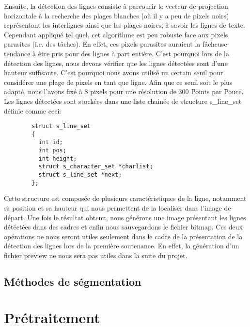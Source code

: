\documentclass[]{report}
\begin{document}
      Ensuite, la détection des lignes consiste à parcourir le vecteur de projection horizontale à la recherche des plages blanches (où il y a peu de pixels noirs) représentant les interlignes ainsi que les plages noires, à savoir les lignes de texte.
      Cependant appliqué tel quel, cet algorithme est peu robuste face aux pixels parasites (i.e. des tâches). En effet, ces pixels parasites auraient la fâcheuse tendance à être pris pour des lignes à part entière. C'est pourquoi lors de la détection des lignes, nous devons vérifier que les lignes détectées sont d'une hauteur suffisante. C'est pourquoi nous avons utilisé un certain seuil pour considérer une plage de pixels en tant que ligne. Afin que ce seuil soit le plus adapté, nous l'avons fixé à 8 pixels pour une résolution de 300 Points par Pouce. Les lignes détectées sont stockées dans une liste chainée de structure s_line_set définie comme ceci:

      \begin{verbatim}
        struct s_line_set
        {
          int id;
          int pos;
          int height;
          struct s_character_set *charlist;
          struct s_line_set *next;
        };
      \end{verbatim}

      Cette structure est composée de plusieurs caractéristiques de la ligne, notamment sa position et sa hauteur qui nous permettent de la localiser dans l'image de départ.
      Une fois le résultat obtenu, nous générons une image présentant les lignes détéctées dans des cadres et enfin nous sauvegardons le fichier bitmap. Ces deux opérations ne nous seront utiles seulement dans le cadre de la présentation de la détection des lignes lors de la première soutenance. En effet, la génération d'un fichier preview ne nous sera pas utiles dans la suite du projet.


    \section{M\'ethodes de s\'egmentation} %
    \label{sec:m'ethodes_de_s\'egmentation}





	\chapter{Pr\'etraitement} %
	\label{cha:pr'etraitement}
\end{document}
